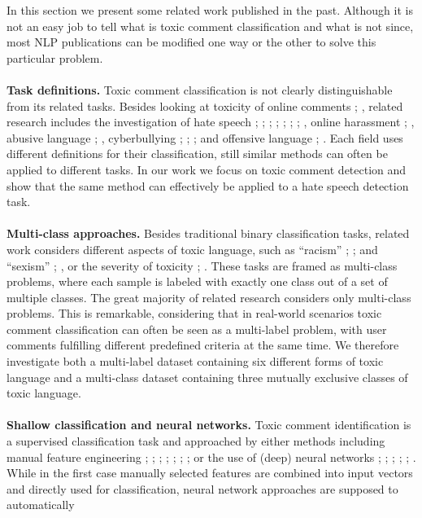 \documentclass[10pt,twocolumn,letterpaper]{article}
\begin{document}
In this section we present some related work published in the past. Although it is not an easy job to tell what is toxic comment classification and what is not since, most NLP publications can be modified one way or the other to solve this particular problem.\\\\
\textbf{Task definitions.} Toxic comment classification is not clearly distinguishable from its related tasks. Besides looking at toxicity of online comments \cite{r04}; \cite{r05}, related research includes the investigation of hate speech \cite{r02}; \cite{r06}; \cite{r07}; \cite{r08}; \cite{r09}; \cite{r10}; \cite{r11}; \cite{r12}, online harassment \cite{r13}; \cite{r14}, abusive language \cite{r15}; \cite{r16}, cyberbullying \cite{r17}; \cite{r18}; \cite{r19}; \cite{r20} and offensive language \cite{r21}; \cite{r22}. Each field uses different definitions for their classification, still similar methods can often be applied to different tasks. In our work we focus on toxic comment detection and show that the same method can effectively be applied to a hate speech
 detection task.\\\\
\textbf{Multi-class approaches.} Besides traditional binary classification tasks, related work considers different aspects of toxic language, such as “racism” \cite{r23}; \cite{r24}; \cite{r25} and “sexism” \cite{r26}; \cite{r27}, or the severity of toxicity \cite{r07}; \cite{r28}. These tasks are framed as multi-class problems, where each sample is labeled with exactly one class out
of a set of multiple classes. The great majority
of related research considers only multi-class problems. This is remarkable, considering that in real-world scenarios toxic comment classification
can often be seen as a multi-label problem, with
user comments fulfilling different predefined
criteria at the same time. We therefore investigate
both a multi-label dataset containing six different
forms of toxic language and a multi-class dataset
containing three mutually exclusive classes of
toxic language.
\\\\
\textbf{Shallow classification and neural networks.} Toxic comment identification is a supervised classification task and approached by either methods including manual feature engineering \cite{r06}; \cite{r15};
\cite{r24}; \cite{r07}; \cite{r29}; \cite{r30}; \cite{r31}; \cite{r32} or the use of
(deep) neural networks \cite{r33};
\cite{r01}; \cite{r02}; \cite{r11}; \cite{r16}; \cite{r08}. While in the first case manually selected features are combined into input vectors and directly used for classification, neural network approaches are supposed to automatically
\end{document}
